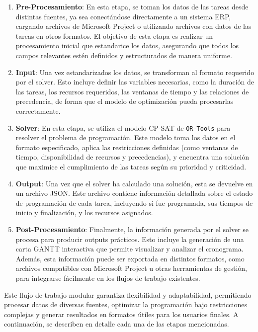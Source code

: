 \documentclass{article}
\begin{document}
\begin{enumerate}
    \item \textbf{Pre-Procesamiento}: En esta etapa, se toman los datos de las tareas desde distintas fuentes, ya sea conectándose directamente a un sistema ERP, cargando archivos de Microsoft Project o utilizando archivos con datos de las tareas en otros formatos. El objetivo de esta etapa es realizar un procesamiento inicial que estandarice los datos, asegurando que todos los campos relevantes estén definidos y estructurados de manera uniforme.

    \item \textbf{Input}: Una vez estandarizados los datos, se transforman al formato requerido por el solver. Esto incluye definir las variables necesarias, como la duración de las tareas, los recursos requeridos, las ventanas de tiempo y las relaciones de precedencia, de forma que el modelo de optimización pueda procesarlas correctamente.

    \item \textbf{Solver}: En esta etapa, se utiliza el modelo CP-SAT de \texttt{OR-Tools} para resolver el problema de programación. Este modelo toma los datos en el formato especificado, aplica las restricciones definidas (como ventanas de tiempo, disponibilidad de recursos y precedencias), y encuentra una solución que maximice el cumplimiento de las tareas según su prioridad y criticidad.

    \item \textbf{Output}: Una vez que el solver ha calculado una solución, esta se devuelve en un archivo JSON. Este archivo contiene información detallada sobre el estado de programación de cada tarea, incluyendo si fue programada, sus tiempos de inicio y finalización, y los recursos asignados.

    \item \textbf{Post-Procesamiento}: Finalmente, la información generada por el solver se procesa para producir outputs prácticos. Esto incluye la generación de una carta GANTT interactiva que permite visualizar y analizar el cronograma. Además, esta información puede ser exportada en distintos formatos, como archivos compatibles con Microsoft Project u otras herramientas de gestión, para integrarse fácilmente en los flujos de trabajo existentes.
\end{enumerate}

Este flujo de trabajo modular garantiza flexibilidad y adaptabilidad, permitiendo procesar datos de diversas fuentes, optimizar la programación bajo restricciones complejas y generar resultados en formatos útiles para los usuarios finales. A continuación, se describen en detalle cada una de las etapas mencionadas.
\end{document}
